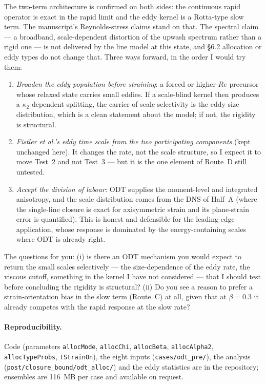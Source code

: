\documentclass[11pt,a4paper]{article}
\begin{document}
The two-term architecture is confirmed on both sides: the continuous
rapid operator is exact in the rapid limit and the eddy kernel is a
Rotta-type slow term. The manuscript's Reynolds-stress claims stand on
that. The spectral claim --- a broadband, scale-dependent distortion of
the upwash spectrum rather than a rigid one --- is not delivered by the
line model at this state, and \S6.2 allocation or eddy types do not change
that. Three ways forward, in the order I would try them:
\begin{enumerate}[leftmargin=2em,itemsep=2pt]
\item \emph{Broaden the eddy population before straining}: a forced or
  higher-$Re$ precursor whose relaxed state carries small eddies. If a
  scale-blind kernel then produces a $\kappa_2$-dependent splitting, the
  carrier of scale selectivity is the eddy-size distribution, which is a
  clean statement about the model; if not, the rigidity is structural.
\item \emph{Fistler et al.'s eddy time scale from the two participating
  components} (kept unchanged here). It changes the rate, not the scale
  structure, so I expect it to move Test~2 and not Test~3 --- but it is
  the one element of Route~D still untested.
\item \emph{Accept the division of labour}: ODT supplies the moment-level
  and integrated anisotropy, and the scale distribution comes from the DNS
  of Half~A (where the single-line closure is exact for axisymmetric
  strain and its plane-strain error is quantified). This is honest and
  defensible for the leading-edge application, whose response is
  dominated by the energy-containing scales where ODT is already right.
\end{enumerate}
The questions for you: (i) is there an ODT mechanism you would expect to
return the small scales selectively --- the size-dependence of the eddy
rate, the viscous cutoff, something in the kernel I have not considered
--- that I should test before concluding the rigidity is structural? (ii)
Do you see a reason to prefer a strain-orientation bias in the slow term
(Route~C) at all, given that at $\beta=0.3$ it already competes with the
rapid response at the slow rate?

\paragraph{Reproducibility.} Code (parameters \texttt{allocMode},
\texttt{allocChi}, \texttt{allocBeta}, \texttt{allocAlpha2},
\texttt{allocTypeProbs}, \texttt{tStrainOn}), the eight inputs
(\texttt{cases/odt\_pre/}), the analysis
(\texttt{post/closure\_bound/odt\_alloc/}) and the eddy statistics are in
the repository; ensembles are 116~MB per case and available on request.
\end{document}
